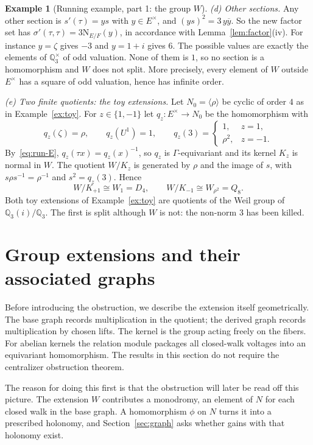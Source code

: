 \documentclass[12pt,letterpaper]{article}
\numberwithin{equation}{section}
\theoremstyle{plain}
\theoremstyle{definition}
\newtheorem{example}[theorem]{Example}
\newcommand{\Q}{\mathbb{Q}}
\newcommand{\Nm}{\mathrm{N}_{E/F}}
\begin{document}
\begin{example}[Running example, part 1: the group $W$]
\smallskip\noindent\emph{(d) Other sections.} Any other section is
$s'(\tau)=ys$ with $y\in E^\times$, and $(ys)^2=3\,y\overline{y}$. So the
new factor set has $\sigma'(\tau,\tau)=3\Nm(y)$, in accordance with
Lemma~\ref{lem:factor}(iv). For instance $y=\zeta$ gives $-3$ and $y=1+i$
gives $6$. The possible values are exactly the elements of $\Q_3^\times$
of odd valuation. None of them is $1$, so no section is a homomorphism
and $W$ does not split. More precisely, every element of $W$ outside
$E^\times$ has a square of odd valuation, hence has infinite order.

\smallskip\noindent\emph{(e) Two finite quotients: the toy extensions.}
Let $N_0=\langle\rho\rangle$ be cyclic of order $4$ as in
Example~\ref{ex:toy}. For $z\in\{1,-1\}$ let $q_z:E^\times\to N_0$ be the
homomorphism with
\[
q_z(\zeta)=\rho,\qquad q_z(U^1)=1,\qquad
q_z(3)=\begin{cases}1,&z=1,\\ \rho^2,&z=-1.\end{cases}
\]
By~\eqref{eq:run-E}, $q_z(\tau x)=q_z(x)^{-1}$, so $q_z$ is
$\Gamma$-equivariant and its kernel $K_z$ is normal in $W$. The quotient
$W/K_z$ is generated by $\rho$ and the image of $s$, with
$s\rho s^{-1}=\rho^{-1}$ and $s^2=q_z(3)$. Hence
\[
W/K_{+1}\cong W_1=D_4,\qquad W/K_{-1}\cong W_{\rho^2}=Q_8 .
\]
Both toy extensions of Example~\ref{ex:toy} are quotients of the Weil
group of $\Q_3(i)/\Q_3$. The first is split although $W$ is not: the
non-norm $3$ has been killed.
\end{example}

\section{Group extensions and their associated graphs}\label{sec:graph-foundations}

Before introducing the obstruction, we describe the extension itself geometrically. The base graph records multiplication in the quotient; the derived graph records multiplication by chosen lifts. The kernel is the group acting freely on the fibers. For abelian kernels the relation module packages all closed-walk voltages into an equivariant homomorphism. The results in this section do not require the centralizer obstruction theorem.

The reason for doing this first is that the obstruction will later be
read off this picture. The extension $W$ contributes a monodromy, an
element of $N$ for each closed walk in the base graph. A homomorphism
$\phi$ on $N$ turns it into a prescribed holonomy, and
Section~\ref{sec:graph} asks whether gains with that holonomy exist.
\end{document}
